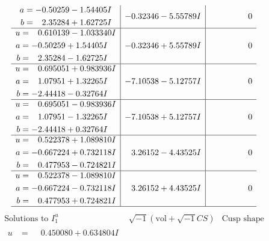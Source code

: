\documentclass[1p]{elsarticle_modified}
\theoremstyle{definition}
\newcommand{\I}{\sqrt{-1}}
\begin{document}
$$\begin{array}{c|c|c}
\begin{aligned}
a &= -0.50259 - 1.54405 I \\
b &= \phantom{-}2.35284 + 1.62725 I\end{aligned}
 & -0.32346 - 5.55789 I & \phantom{-0.000000 } 0 \\ \hline\begin{aligned}
u &= \phantom{-}0.610139 - 1.033340 I \\
a &= -0.50259 + 1.54405 I \\
b &= \phantom{-}2.35284 - 1.62725 I\end{aligned}
 & -0.32346 + 5.55789 I & \phantom{-0.000000 } 0 \\ \hline\begin{aligned}
u &= \phantom{-}0.695051 + 0.983936 I \\
a &= \phantom{-}1.07951 + 1.32265 I \\
b &= -2.44418 - 0.32764 I\end{aligned}
 & -7.10538 - 5.12757 I & \phantom{-0.000000 } 0 \\ \hline\begin{aligned}
u &= \phantom{-}0.695051 - 0.983936 I \\
a &= \phantom{-}1.07951 - 1.32265 I \\
b &= -2.44418 + 0.32764 I\end{aligned}
 & -7.10538 + 5.12757 I & \phantom{-0.000000 } 0 \\ \hline\begin{aligned}
u &= \phantom{-}0.522378 + 1.089810 I \\
a &= -0.667224 + 0.732118 I \\
b &= \phantom{-}0.477953 - 0.724821 I\end{aligned}
 & \phantom{-}3.26152 - 4.43525 I & \phantom{-0.000000 } 0 \\ \hline\begin{aligned}
u &= \phantom{-}0.522378 - 1.089810 I \\
a &= -0.667224 - 0.732118 I \\
b &= \phantom{-}0.477953 + 0.724821 I\end{aligned}
 & \phantom{-}3.26152 + 4.43525 I & \phantom{-0.000000 } 0\\
 \hline 
 \end{array}$$\newpage$$\begin{array}{c|c|c}  
\text{Solutions to }I^u_{1}& \I (\text{vol} + \sqrt{-1}CS) & \text{Cusp shape}\\
 \hline 
\begin{aligned}
u &= \phantom{-}0.450080 + 0.634804 I \\

\end{aligned}
\end{array}$$
\end{document}
